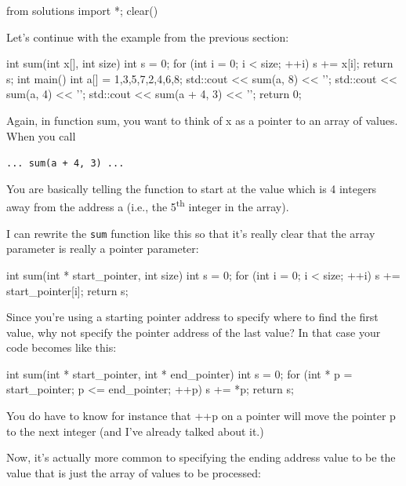 \begin{python0}
from solutions import *; clear()
\end{python0}

Let's continue with the example from the previous section:

\begin{consolethree}[escapeinside=||]
int sum(int x[], int size)
{
    int s = 0;
    for (int i = 0; i < size; ++i)
    {
        s += x[i];
    }
    return s;
}
int main()
{
    int a[] = {1,3,5,7,2,4,6,8};
    std::cout << sum(a, 8) << '\n';
    std::cout << sum(a, 4) << '\n';
    std::cout << sum(a + 4, 3) << '\n';
    return 0;
}
\end{consolethree}

Again, in function sum, you want to think of x as a pointer to an array
of values. When you call

\verb!... sum(a + 4, 3) ...!

You are basically telling the function to start at the value which is 4
integers away from the address a (i.e., the 5\textsuperscript{th}
integer in the array).

I can rewrite the \texttt{sum} function like this so that it's really
clear that the array parameter is really a pointer parameter:

\begin{consolethree}[escapeinside=||]
int sum(int * start_pointer, int size)
{
    int s = 0;
    for (int i = 0; i < size; ++i)
    {
        s += start_pointer[i];
    }
    return s;
}
\end{consolethree}

Since you're using a starting pointer address to specify where to find the first value, why not specify the pointer address of the last value? In that case your code becomes  like this:

\begin{consolethree}[escapeinside=||]
int sum(int * start_pointer, int * end_pointer)
{
    int s = 0;
    for (int * p = start_pointer;
         p <= end_pointer; ++p)
    {
        s += *p;
    }
    return s;
}
\end{consolethree}

You do have to know for instance that ++p on a pointer will move the pointer p to the next integer (and I've already talked about it.)

Now, it's actually more common to specifying the ending address value to be the value that is just  the array of values to be processed:

